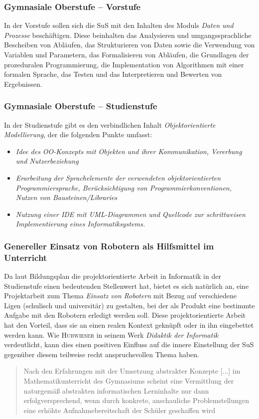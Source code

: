 \documentclass[paper=a4, pagesize, DIV=calc, BCOR=12.5mm, twoside=on, onecolumn=on, open = any, titlepage =on, parskip =half-, headsepline = on, footsepline = on, chapterprefix = on, appendixprefix = off, fontsize = 12pt, numbers = noenddot, abstract = on]{scrbook}
\numberwithin{equation}{chapter}
\theoremstyle{definition}
\theoremstyle{plain}
\theoremstyle{plain}
\theoremstyle{remark}
\theoremstyle{plain}
\theoremstyle{plain}
\begin{document}
\subsubsection{Gymnasiale Oberstufe -- Vorstufe}

In der Vorstufe sollen sich die SuS mit den Inhalten des Moduls \emph{Daten und Prozesse} beschäftigen. Diese beinhalten das Analysieren und umgangssprachliche Bescheiben von Abläufen, das Strukturieren von Daten sowie die Verwendung von Variablen und Parametern, das Formalisieren von Abläufen, die Grundlagen der prozeduralen Programmierung, die Implementation von Algorithmen mit einer formalen Sprache, das Testen und das Interpretieren und Bewerten von Ergebnissen. 

\subsubsection{Gymnasiale Oberstufe -- Studienstufe}

In der Studienstufe gibt es den verbindlichen Inhalt \emph{Objektorientierte Modellierung}, der die folgenden Punkte umfasst:\\
\begin{itemize}
\item \emph{Idee des OO-Konzepts mit Objekten und ihrer Kommunikation, Vererbung und Nutzerbeziehung}
\item \emph{Erarbeitung der Sprachelemente der verwendeten objektorientierten Programmiersprache, Berücksichtigung von Programmierkonventionen, Nutzen von Bausteinen/Libraries}
\item \emph{Nutzung einer IDE mit UML-Diagrammen und Quellcode zur schrittweisen Implementierung eines Informatiksystems.}
\end{itemize}

\subsubsection{Genereller Einsatz von Robotern als Hilfsmittel im Unterricht}
Da laut Bildungsplan die projektorientierte Arbeit in Informatik in der Studienstufe einen bedeutenden Stellenwert hat, bietet es sich natürlich an, eine Projektarbeit zum Thema \emph{Einsatz von Robotern} mit Bezug auf verschiedene Ligen (schulisch und universitär) zu gestalten, bei der als Produkt eine bestimmte Aufgabe mit den Robotern erledigt werden soll.  Diese projektorientierte Arbeit hat den Vorteil, dass sie an einen realen Kontext geknüpft oder in ihn eingebettet werden kann. Wie \textsc{Hubwieser} in seinem Werk \emph{Didaktik der Informatik} verdeutlicht, kann dies einen positiven Einfluss auf die innere Einstellung der SuS gegenüber diesem teilweise recht anspruchsvollen Thema haben.
\begin{quote}
Nach den Erfahrungen mit der Umsetzung abstrakter Konzepte [...] im Mathematikunterricht des Gymnasiums scheint eine Vermittlung der naturgemäß abstrakten informatischen Lerninhalte nur dann erfolgversprechend, wenn durch konkrete, anschauliche Problemstellungen eine erhöhte Aufnahmebereitschaft der Schüler geschaffen wird \cite[S.68]{hubwieser:07}
\end{quote}
\end{document}
